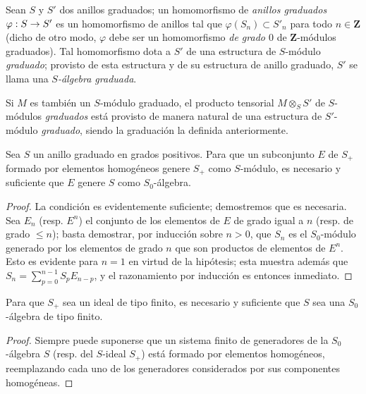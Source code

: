 \documentclass[oneside,10pt]{amsart}
\makeatletter
\renewcommand{\leq}{\leqslant}
\newcommand{\ega@arrow}[2]{\mathchoice{#1}{#2}{#2}{#2}}
\renewcommand{\to}{\ega@arrow{\longrightarrow}{\rightarrow}}
\newcommand{\oldpage}[2][]{\marginnote{\normalfont\footnotesize\textbf{#1}~|~#2}\ignorespaces}
\let\EGAOriginalLabel\label
\renewcommand{\label}[1]{\phantomsection\EGAOriginalLabel{#1}}
\makeatother
\begin{document}
\begin{env}[2.1.2]
\oldpage[II]{21}
Sean $S$ y $S'$ dos anillos graduados; un homomorfismo de \emph{anillos graduados $\varphi:S\to S'$} es un homomorfismo de anillos tal que $\varphi(S_n)\subset S'_n$ para todo $n\in\mathbf{Z}$ (dicho de otro modo, $\varphi$ debe ser un homomorfismo \emph{de grado $0$} de $\mathbf{Z}$-módulos graduados).
Tal homomorfismo dota a $S'$ de una estructura de $S$-módulo \emph{graduado}; provisto de esta estructura y de su estructura de anillo graduado, $S'$ se llama una \emph{$S$-álgebra graduada}.

Si $M$ es también un $S$-módulo graduado, el producto tensorial $M\otimes_S S'$ de $S$-módulos \emph{graduados} está provisto de manera natural de una estructura de $S'$-módulo \emph{graduado}, siendo la graduación la definida anteriormente.
\end{env}

\begin{lemma}[2.1.3]
\label{II.2.1.3-fr}
Sea $S$ un anillo graduado en grados positivos.
Para que un subconjunto $E$ de $S_+$ formado por elementos homogéneos genere $S_+$ como $S$-módulo, es necesario y suficiente que $E$ genere $S$ como $S_0$-álgebra.
\end{lemma}

\begin{proof}
La condición es evidentemente suficiente; demostremos que es necesaria.
Sea $E_n$ (resp. $E^n$) el conjunto de los elementos de $E$ de grado igual a $n$ (resp. de grado $\leq n$); basta demostrar, por inducción sobre $n>0$, que $S_n$ es el $S_0$-módulo generado por los elementos de grado $n$ que son productos de elementos de $E^n$.
Esto es evidente para $n=1$ en virtud de la hipótesis; esta muestra además que
$S_n=\sum_{p=0}^{n-1}S_pE_{n-p}$,
y el razonamiento por inducción es entonces inmediato.
\end{proof}

\begin{corollary}[2.1.4]
\label{II.2.1.4-fr}
Para que $S_+$ sea un ideal de tipo finito, es necesario y suficiente que $S$ sea una $S_0$-álgebra de tipo finito.
\end{corollary}

\begin{proof}
Siempre puede suponerse que un sistema finito de generadores de la $S_0$-álgebra $S$ (resp. del $S$-ideal $S_+$) está formado por elementos homogéneos, reemplazando cada uno de los generadores considerados por sus componentes homogéneas.
\end{proof}
\end{document}
